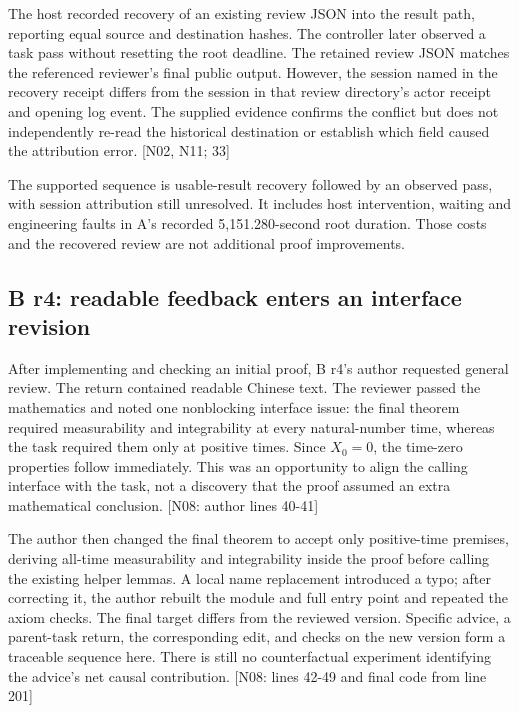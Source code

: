 The host recorded recovery of an existing review JSON into the result path, reporting equal source and destination hashes. The controller later observed a task pass without resetting the root deadline. The retained review JSON matches the referenced reviewer's final public output. However, the session named in the recovery receipt differs from the session in that review directory's actor receipt and opening log event. The supplied evidence confirms the conflict but does not independently re-read the historical destination or establish which field caused the attribution error. [N02, N11; 33]

The supported sequence is usable-result recovery followed by an observed pass, with session attribution still unresolved. It includes host intervention, waiting and engineering faults in A's recorded 5,151.280-second root duration. Those costs and the recovered review are not additional proof improvements.

\subsection[B r4: readable feedback enters an interface revision]{\texorpdfstring{\protect\hypertarget{g7}{}B r4: readable feedback enters an interface revision}{B r4: readable feedback enters an interface revision}}
After implementing and checking an initial proof, B r4's author requested general review. The return contained readable Chinese text. The reviewer passed the mathematics and noted one nonblocking interface issue: the final theorem required measurability and integrability at every natural-number time, whereas the task required them only at positive times. Since $X_0=0$, the time-zero properties follow immediately. This was an opportunity to align the calling interface with the task, not a discovery that the proof assumed an extra mathematical conclusion. [N08: author lines 40-41]

The author then changed the final theorem to accept only positive-time premises, deriving all-time measurability and integrability inside the proof before calling the existing helper lemmas. A local name replacement introduced a typo; after correcting it, the author rebuilt the module and full entry point and repeated the axiom checks. The final target differs from the reviewed version. Specific advice, a parent-task return, the corresponding edit, and checks on the new version form a traceable sequence here. There is still no counterfactual experiment identifying the advice's net causal contribution. [N08: lines 42-49 and final code from line 201]

